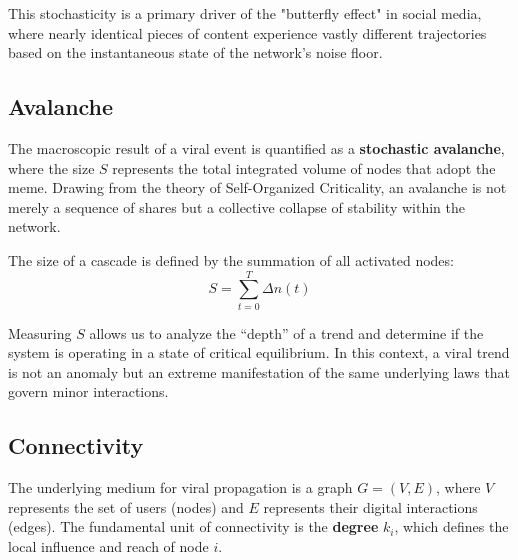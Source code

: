 \documentclass[12pt]{article}
\begin{document}
\vspace{0.8cm}

This stochasticity is a primary driver of the "butterfly effect" in social media, where nearly identical pieces of content experience vastly different trajectories based on the instantaneous state of the network's noise floor.

\vfill
\newpage

\newpage

\subsection{Avalanche}

The macroscopic result of a viral event is quantified as a \textbf{stochastic avalanche}, where the size $S$ represents the total integrated volume of nodes that adopt the meme. Drawing from the theory of Self-Organized Criticality, an avalanche is not merely a sequence of shares but a collective collapse of stability within the network. 

\vspace{0.4cm}
The size of a cascade is defined by the summation of all activated nodes:
\begin{equation}
S = \sum_{t=0}^{T} \Delta n(t)
\end{equation}
\vspace{0.4cm}


Measuring $S$ allows us to analyze the ``depth'' of a trend and determine if the system is operating in a state of critical equilibrium. In this context, a viral trend is not an anomaly but an extreme manifestation of the same underlying laws that govern minor interactions.

\vfill %

\subsection{Connectivity}

The underlying medium for viral propagation is a graph $G = (V, E)$, where $V$ represents the set of users (nodes) and $E$ represents their digital interactions (edges). The fundamental unit of connectivity is the \textbf{degree} $k_i$, which defines the local influence and reach of node $i$.
\end{document}
